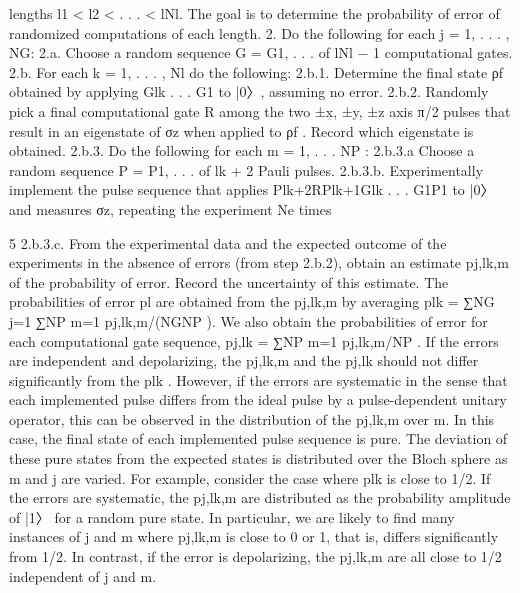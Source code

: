 lengths l1 < l2 < . . . < lNl. The goal is to determine the probability of error of randomized computations of each length. 2. Do the following for each j = 1, . . . , NG: 2.a. Choose a random sequence G = {G1, . . .} of lNl − 1 computational gates. 2.b. For each k = 1, . . . , Nl do the following: 2.b.1. Determine the final state ρf obtained by applying Glk . . . G1 to |0〉, assuming no error. 2.b.2. Randomly pick a final computational gate R among the two ±x, ±y, ±z axis π/2 pulses that result in an eigenstate of σz when applied to ρf . Record which eigenstate is obtained. 2.b.3. Do the following for each m = 1, . . . NP : 2.b.3.a Choose a random sequence P = {P1, . . .} of lk + 2 Pauli pulses. 2.b.3.b. Experimentally implement the pulse sequence that applies Plk+2RPlk+1Glk . . . G1P1 to |0〉 and measures σz, repeating the experiment Ne times

5 2.b.3.c. From the experimental data and the expected outcome of the experiments in the absence of errors (from step 2.b.2), obtain an estimate pj,lk,m of the probability of error. Record the uncertainty of this estimate. The probabilities of error pl are obtained from the pj,lk,m by averaging plk = ∑NG j=1 ∑NP m=1 pj,lk,m/(NGNP ). We also obtain the probabilities of error for each computational gate sequence, pj,lk = ∑NP m=1 pj,lk,m/NP . If the errors are independent and depolarizing, the pj,lk,m and the pj,lk should not differ significantly from the plk . However, if the errors are systematic in the sense that each implemented pulse differs from the ideal pulse by a pulse-dependent unitary operator, this can be observed in the distribution of the pj,lk,m over m. In this case, the final state of each implemented pulse sequence is pure. The deviation of these pure states from the expected states is distributed over the Bloch sphere as m and j are varied. For example, consider the case where plk is close to 1/2. If the errors are systematic, the pj,lk,m are distributed as the probability amplitude of |1〉 for a random pure state. In particular, we are likely to find many instances of j and m where pj,lk,m is close to 0 or 1, that is, differs significantly from 1/2. In contrast, if the error is depolarizing, the pj,lk,m are all close to 1/2 independent of j and m.